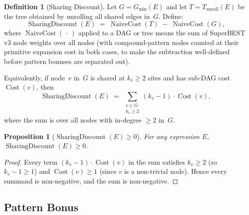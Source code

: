 \documentclass[12pt,a4paper]{article}
\newtheorem{proposition}[theorem]{Proposition}
\theoremstyle{definition}
\newtheorem{definition}[theorem]{Definition}
\newcommand{\Cost}{\operatorname{Cost}}
\newcommand{\NC}{\operatorname{NaiveCost}}
\newcommand{\SD}{\operatorname{SharingDiscount}}
\newcommand{\Gmin}{G_{\min}(E)}
\newcommand{\Tunroll}{T_{\mathrm{unroll}}(E)}
\begin{document}
\begin{definition}[Sharing Discount]
\label{def:SD}
Let $G = \Gmin$ and let $T = \Tunroll$ be the tree obtained by unrolling all
shared edges in~$G$.  Define:
\[
  \SD(E) \;=\; \NC(T) \;-\; \NC(G),
\]
where $\NC(\,\cdot\,)$ applied to a DAG or tree means the sum of
SuperBEST v3 node weights over all nodes (with compound-pattern nodes counted
at their primitive expansion cost in both cases, to make the subtraction
well-defined before pattern bonuses are separated out).

Equivalently, if node~$v$ in~$G$ is shared at $k_v \geq 2$ sites and has
sub-DAG cost $\Cost(v)$, then
\[
  \SD(E) \;=\; \sum_{\substack{v \in G \\ k_v \geq 2}} (k_v - 1)\cdot \Cost(v),
\]
where the sum is over all nodes with in-degree $\geq 2$ in~$G$.
\end{definition}

\begin{proposition}[$\SD(E) \geq 0$]
\label{prop:SD-nonneg}
For any expression $E$, $\SD(E) \geq 0$.
\end{proposition}

\begin{proof}
Every term $(k_v - 1)\cdot \Cost(v)$ in the sum satisfies $k_v \geq 2$ (so
$k_v - 1 \geq 1$) and $\Cost(v) \geq 1$ (since $v$ is a non-trivial node).
Hence every summand is non-negative, and the sum is non-negative.
\end{proof}

\subsection{Pattern Bonus}
\end{document}
